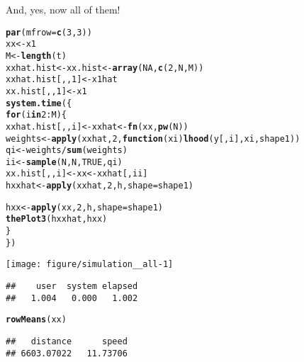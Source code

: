 \documentclass[11pt]{article}\usepackage[]{graphicx}\usepackage[]{color}
\makeatletter
\def\maxwidth{ %
  \ifdim\Gin@nat@width>\linewidth
    \linewidth
  \else
    \Gin@nat@width
  \fi
}
\newcommand{\hlnum}[1]{\textcolor[rgb]{0.686,0.059,0.569}{#1}}%
\newcommand{\hlopt}[1]{\textcolor[rgb]{0,0,0}{#1}}%
\newcommand{\hlstd}[1]{\textcolor[rgb]{0.345,0.345,0.345}{#1}}%
\newcommand{\hlkwa}[1]{\textcolor[rgb]{0.161,0.373,0.58}{\textbf{#1}}}%
\newcommand{\hlkwb}[1]{\textcolor[rgb]{0.69,0.353,0.396}{#1}}%
\newcommand{\hlkwc}[1]{\textcolor[rgb]{0.333,0.667,0.333}{#1}}%
\newcommand{\hlkwd}[1]{\textcolor[rgb]{0.737,0.353,0.396}{\textbf{#1}}}%
\newenvironment{kframe}{%
 \def\at@end@of@kframe{}%
 \ifinner\ifhmode%
  \def\at@end@of@kframe{\end{minipage}}%
  \begin{minipage}{\columnwidth}%
 \fi\fi%
 \def\FrameCommand##1{\hskip\@totalleftmargin \hskip-\fboxsep
 \colorbox{shadecolor}{##1}\hskip-\fboxsep
     \hskip-\linewidth \hskip-\@totalleftmargin \hskip\columnwidth}%
 \MakeFramed {\advance\hsize-\width
   \@totalleftmargin\z@ \linewidth\hsize
   \@setminipage}}%
 {\par\unskip\endMakeFramed%
 \at@end@of@kframe}
\newenvironment{knitrout}{}{} %
\makeatother
\begin{document}
And, yes, now all of them!

\begin{knitrout}
\color{fgcolor}\begin{kframe}
\begin{alltt}
\hlkwd{par}\hlstd{(}\hlkwc{mfrow} \hlstd{=} \hlkwd{c}\hlstd{(}\hlnum{3}\hlstd{,} \hlnum{3}\hlstd{))}
\hlstd{xx} \hlkwb{<-} \hlstd{x1}
\hlstd{M} \hlkwb{<-} \hlkwd{length}\hlstd{(t)}
\hlstd{xxhat.hist} \hlkwb{<-} \hlstd{xx.hist} \hlkwb{<-} \hlkwd{array}\hlstd{(}\hlnum{NA}\hlstd{,} \hlkwd{c}\hlstd{(}\hlnum{2}\hlstd{, N, M))}
\hlstd{xxhat.hist[,,}\hlnum{1}\hlstd{]} \hlkwb{<-} \hlstd{x1hat}
\hlstd{xx.hist[,,}\hlnum{1}\hlstd{]} \hlkwb{<-} \hlstd{x1}
\hlkwd{system.time}\hlstd{(\{}
    \hlkwa{for} \hlstd{(i} \hlkwa{in} \hlnum{2}\hlopt{:}\hlstd{M) \{}
        \hlstd{xxhat.hist[,,i]} \hlkwb{<-} \hlstd{xxhat} \hlkwb{<-} \hlkwd{fn}\hlstd{(xx,} \hlkwd{pw}\hlstd{(N))}
        \hlstd{weights} \hlkwb{<-} \hlkwd{apply}\hlstd{(xxhat,} \hlnum{2}\hlstd{,} \hlkwa{function}\hlstd{(}\hlkwc{xi}\hlstd{)} \hlkwd{lhood}\hlstd{(y[, i], xi, shape1))}
        \hlstd{qi} \hlkwb{<-} \hlstd{weights} \hlopt{/} \hlkwd{sum}\hlstd{(weights)}
        \hlstd{ii} \hlkwb{<-} \hlkwd{sample}\hlstd{(N, N,} \hlnum{TRUE}\hlstd{, qi)}
        \hlstd{xx.hist[,,i]} \hlkwb{<-} \hlstd{xx} \hlkwb{<-} \hlstd{xxhat[, ii]}
        \hlstd{hxxhat} \hlkwb{<-} \hlkwd{apply}\hlstd{(xxhat,} \hlnum{2}\hlstd{, h,} \hlkwc{shape} \hlstd{= shape1)}

        \hlstd{hxx} \hlkwb{<-} \hlkwd{apply}\hlstd{(xx,} \hlnum{2}\hlstd{, h,} \hlkwc{shape} \hlstd{= shape1)}
        \hlkwd{thePlot3}\hlstd{(hxxhat, hxx)}
    \hlstd{\}}
\hlstd{\})}
\end{alltt}
\end{kframe}

{\centering \texttt{[image: figure/simulation\_\_all-1]} 

}


\begin{kframe}\begin{verbatim}
##    user  system elapsed 
##   1.004   0.000   1.002
\end{verbatim}
\begin{alltt}
\hlkwd{rowMeans}\hlstd{(xx)}
\end{alltt}
\begin{verbatim}
##   distance      speed 
## 6603.07022   11.73706
\end{verbatim}
\end{kframe}
\end{knitrout}
\end{document}
